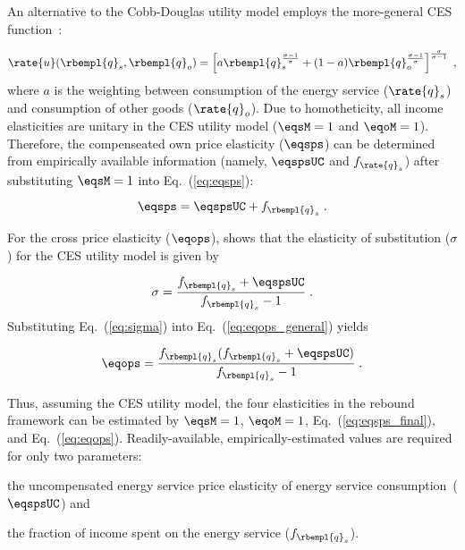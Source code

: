 An alternative to the Cobb-Douglas utility model employs 
the more-general CES function~\citep{Lemoine:2020aa}:

\begin{equation}
  \rate{u}(\rbempl{q}_s,\rbempl{q}_o) = 
      \left[ a \rbempl{q}_s^{\frac{\sigma-1}{\sigma}} 
            + (1-a) \rbempl{q}_o^{\frac{\sigma-1}{\sigma}} \right]                
                                   ^{\frac{\sigma}{\sigma-1}} \; ,
\end{equation}
%
where $a$ is the weighting between 
consumption of the energy service ($\rate{q}_s$)
and consumption of other goods ($\rate{q}_o$). 
Due to homotheticity,
all income elasticities are unitary in the CES utility model
($\eqsM = 1$ and $\eqoM = 1$).
Therefore,
the compenseated own price elasticity ($\eqsps$) can be 
determined from empirically available information
(namely, $\eqspsUC$ and $f_{\rate{q}_s}$) 
after substituting $\eqsM = 1$ into Eq.~(\ref{eq:eqsps}):

\begin{equation} \label{eq:eqsps_final}
  \eqsps = \eqspsUC + f_{\rbempl{q}_s} \; .
\end{equation}
%

For the cross price elasticity ($\eqops$), 
\citet{Gortz1977} shows that
the elasticity of substitution ($\sigma$) 
for the CES utility model is given by

\begin{equation} \label{eq:sigma}
  \sigma  = \frac{f_{\rbempl{q}_s} + \eqspsUC}{f_{\rbempl{q}_s} -1 } \; .
\end{equation}
%
Substituting Eq.~(\ref{eq:sigma}) into Eq.~(\ref{eq:eqops_general}) yields

\begin{equation} \label{eq:eqops}
  \eqops = \frac{f_{\rbempl{q}_s} (f_{\rbempl{q}_s} + \eqspsUC)}{f_{\rbempl{q}_s}-1} \; .
\end{equation}

Thus, assuming the CES utility model,
the four elasticities in the rebound framework can be estimated by
$\eqsM = 1$,
$\eqoM = 1$, 
Eq.~(\ref{eq:eqsps_final}), and
Eq.~(\ref{eq:eqops}).
Readily-available, empirically-estimated values are required for only two parameters:
%
\begin{enumerate*}[label={(\alph*)}]
	
  \item the uncompensated energy service price elasticity of energy service consumption~($\eqspsUC$) and
  
  \item the fraction of income spent on the energy service ($f_{\rbempl{q}_s}$).
    
\end{enumerate*}

